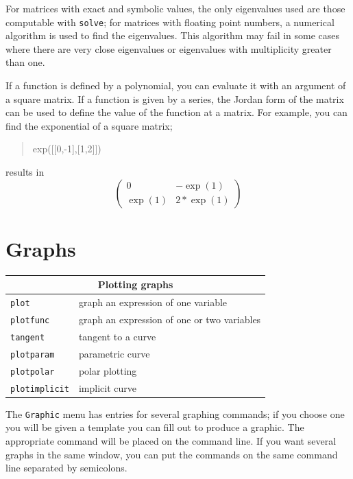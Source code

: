 \documentclass{article}
\newcommand{\xcasin}[1]
{\begin{quote}\ttfamily
#1
\end{quote}}
\newcommand{\xcasout}[1]
{\begin{equation*}
#1
\end{equation*}}
\begin{document}
For matrices with exact and symbolic values, the only eigenvalues used
are those computable with \texttt{solve}; for matrices with floating
point numbers, a numerical algorithm is used to find the eigenvalues.
This algorithm may fail in some cases where there are very close
eigenvalues or eigenvalues with multiplicity greater than one.

If a function is defined by a polynomial, you can evaluate it with an
argument of a square matrix.  If a function is given by a series, the
Jordan form of the matrix can be used to define the value of the
function at a matrix.  For example, you can find the exponential of a
square matrix;
\xcasin{exp([[0,-1],[1,2]])}
results in
\xcasout{
\begin{pmatrix}
0 & -\exp(1)\\
\exp(1) & 2*\exp(1)
\end{pmatrix}}


\section{Graphs}

\begin{center}
\begin{tabular}{|p{}|p{}|}
\hline
\multicolumn{2}{|c|}{\bf Plotting graphs}\\
\hline\hline
\texttt{plot} & graph an expression of one variable\\
\texttt{plotfunc} & graph an expression of one or two variables\\
\texttt{tangent} & tangent to a curve\\
\texttt{plotparam} & parametric curve\\
\texttt{plotpolar} & polar plotting\\
\texttt{plotimplicit} & implicit curve\\
\hline
\end{tabular}
\end{center}

The \texttt{Graphic} menu has entries for several graphing commands;
if you choose one you will be given a template you can fill out to
produce a graphic.  The appropriate command will be placed on the
command line.  If you want several graphs in the same window, you can
put the commands on the same command line separated by semicolons.
\end{document}
